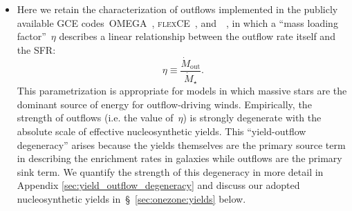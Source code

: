 \documentclass[ms.tex]{subfiles}
\begin{document}
\begin{itemize}
	\item Here we retain the characterization of outflows implemented in the
	publicly available GCE codes~\textsc{OMEGA}~\citep{Cote2017},
	\textsc{flexCE}~\citep{Andrews2017}, and~\vice~\citep{Johnson2020}, in
	which a ``mass loading factor''~$\eta$ describes a linear relationship
	between the outflow rate itself and the SFR:
	\begin{equation}
	\eta \equiv \frac{\dot{M}_\text{out}}{\dot{M}_\star}.
	\label{eq:mass_loading}
	\end{equation}
	This parametrization is appropriate for models in which massive stars are
	the dominant source of energy for outflow-driving winds.
	Empirically, the strength of outflows (i.e. the value of~$\eta$) is
	strongly degenerate with the absolute scale of effective nucleosynthetic
	yields.
	This ``yield-outflow degeneracy'' arises because the yields themselves are
	the primary source term in describing the enrichment rates in galaxies
	while outflows are the primary sink term.
	We quantify the strength of this degeneracy in more detail in Appendix
	\ref{sec:yield_outflow_degeneracy} and discuss our adopted nucleosynthetic
	yields in~\S~\ref{sec:onezone:yields} below.


\end{itemize}
\end{document}
